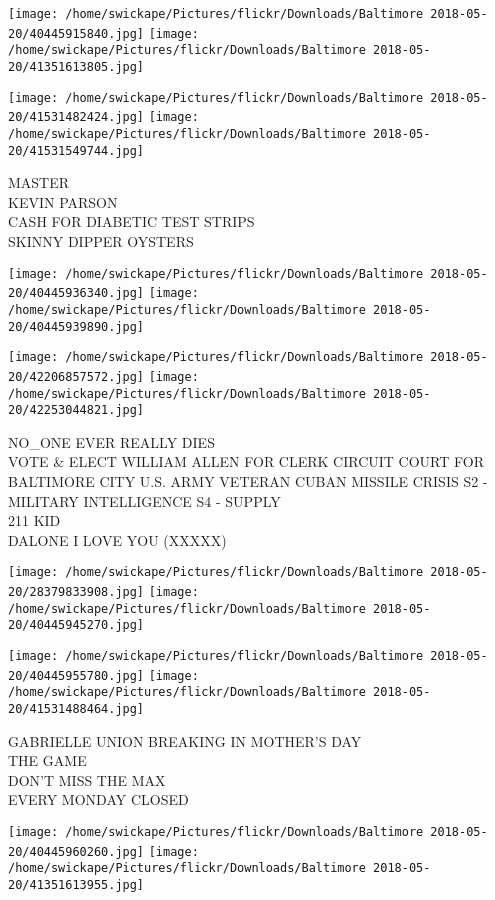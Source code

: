 \documentclass[10pt,letterpaper]{article}
\begin{document}
\texttt{[image: /home/swickape/Pictures/flickr/Downloads/Baltimore 2018-05-20/40445915840.jpg]}
\texttt{[image: /home/swickape/Pictures/flickr/Downloads/Baltimore 2018-05-20/41351613805.jpg]}

\texttt{[image: /home/swickape/Pictures/flickr/Downloads/Baltimore 2018-05-20/41531482424.jpg]}
\texttt{[image: /home/swickape/Pictures/flickr/Downloads/Baltimore 2018-05-20/41531549744.jpg]}

MASTER\\
KEVIN PARSON\\
CASH FOR DIABETIC TEST STRIPS\\
SKINNY DIPPER OYSTERS
\pagebreak

\texttt{[image: /home/swickape/Pictures/flickr/Downloads/Baltimore 2018-05-20/40445936340.jpg]}
\texttt{[image: /home/swickape/Pictures/flickr/Downloads/Baltimore 2018-05-20/40445939890.jpg]}

\texttt{[image: /home/swickape/Pictures/flickr/Downloads/Baltimore 2018-05-20/42206857572.jpg]}
\texttt{[image: /home/swickape/Pictures/flickr/Downloads/Baltimore 2018-05-20/42253044821.jpg]}

NO\_ONE EVER REALLY DIES\\
VOTE \& ELECT WILLIAM ALLEN FOR CLERK CIRCUIT COURT FOR BALTIMORE CITY U.S. ARMY VETERAN CUBAN MISSILE CRISIS S2 {-} MILITARY INTELLIGENCE S4 {-} SUPPLY\\
211 KID\\
DALONE I LOVE YOU (XXXXX)
\pagebreak

\texttt{[image: /home/swickape/Pictures/flickr/Downloads/Baltimore 2018-05-20/28379833908.jpg]}
\texttt{[image: /home/swickape/Pictures/flickr/Downloads/Baltimore 2018-05-20/40445945270.jpg]}

\texttt{[image: /home/swickape/Pictures/flickr/Downloads/Baltimore 2018-05-20/40445955780.jpg]}
\texttt{[image: /home/swickape/Pictures/flickr/Downloads/Baltimore 2018-05-20/41531488464.jpg]}

GABRIELLE UNION BREAKING IN MOTHER'S DAY\\
THE GAME\\
DON'T MISS THE MAX\\
EVERY MONDAY CLOSED
\pagebreak

\texttt{[image: /home/swickape/Pictures/flickr/Downloads/Baltimore 2018-05-20/40445960260.jpg]}
\texttt{[image: /home/swickape/Pictures/flickr/Downloads/Baltimore 2018-05-20/41351613955.jpg]}
\end{document}
